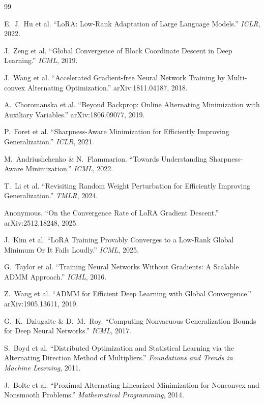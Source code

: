 \documentclass[11pt]{article}
\begin{document}
\begin{thebibliography}{99}

 E.~J.~Hu et al. ``LoRA: Low-Rank Adaptation of Large Language Models.'' \textit{ICLR}, 2022.

 J.~Zeng et al. ``Global Convergence of Block Coordinate Descent in Deep Learning.'' \textit{ICML}, 2019.

 J.~Wang et al. ``Accelerated Gradient-free Neural Network Training by Multi-convex Alternating Optimization.'' arXiv:1811.04187, 2018.

 A.~Choromanska et al. ``Beyond Backprop: Online Alternating Minimization with Auxiliary Variables.'' arXiv:1806.09077, 2019.

 P.~Foret et al. ``Sharpness-Aware Minimization for Efficiently Improving Generalization.'' \textit{ICLR}, 2021.

 M.~Andriushchenko \& N.~Flammarion. ``Towards Understanding Sharpness-Aware Minimization.'' \textit{ICML}, 2022.

 T.~Li et al. ``Revisiting Random Weight Perturbation for Efficiently Improving Generalization.'' \textit{TMLR}, 2024.

 Anonymous. ``On the Convergence Rate of LoRA Gradient Descent.'' arXiv:2512.18248, 2025.

 J.~Kim et al. ``LoRA Training Provably Converges to a Low-Rank Global Minimum Or It Fails Loudly.'' \textit{ICML}, 2025.

 G.~Taylor et al. ``Training Neural Networks Without Gradients: A Scalable ADMM Approach.'' \textit{ICML}, 2016.

 Z.~Wang et al. ``ADMM for Efficient Deep Learning with Global Convergence.'' arXiv:1905.13611, 2019.

 G.~K.~Dziugaite \& D.~M.~Roy. ``Computing Nonvacuous Generalization Bounds for Deep Neural Networks.'' \textit{ICML}, 2017.

 S.~Boyd et al. ``Distributed Optimization and Statistical Learning via the Alternating Direction Method of Multipliers.'' \textit{Foundations and Trends in Machine Learning}, 2011.

 J.~Bolte et al. ``Proximal Alternating Linearized Minimization for Nonconvex and Nonsmooth Problems.'' \textit{Mathematical Programming}, 2014.


\end{thebibliography}
\end{document}
